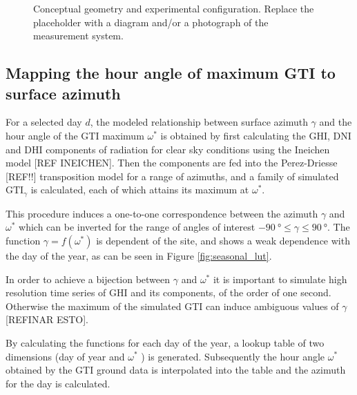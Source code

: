 
\begin{figure}[t]
	\centering
	\caption{Conceptual geometry and experimental configuration. Replace the
	placeholder with a diagram and/or a photograph of the measurement system.}
	\label{fig:geometry}
\end{figure}

\subsection{Mapping the hour angle of maximum GTI to surface azimuth}
\label{subsec:mapping}

For a selected day $d$, the modeled relationship between surface azimuth $\gamma$ and
the hour angle of the GTI maximum $\omega^{*}$ is obtained by first calculating the GHI, DNI and DHI components of radiation for clear sky conditions using the Ineichen model [REF INEICHEN]. Then the components are fed into the Perez-Driesse [REF!!] transposition model for a range of azimuths, and a family of simulated $\text{GTI}_{\gamma}$ is calculated, each of which attains its maximum at $\omega^{*}$.

This procedure induces a one-to-one correspondence between the azimuth $\gamma$ and $\omega^{*}$ which can be inverted for the range of angles of interest $\SI{-90}{\degree} \leq \gamma \leq \SI{+90}{\degree}$. The function $\gamma = f(\omega^{\ast})$ is dependent of the site, and shows a weak dependence with the day of the year, as can be seen in Figure \ref{fig:seasonal_lut}. 

In order to achieve a bijection between $\gamma$ and $\omega^{*}$ it is important to simulate high resolution time series of GHI and its components, of the order of one second. Otherwise the maximum of the simulated GTI can induce ambiguous values of $\gamma$ [REFINAR ESTO].

By calculating the functions for each day of the year, a lookup table of two dimensions (day of year and $\omega^{*}$ ) is generated. Subsequently the hour angle $\omega^{*}$ obtained by the GTI ground data is interpolated into the table and the azimuth for the day is calculated.

